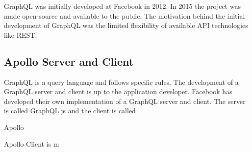 GraphQL was initially developed at Facebook in 2012. In 2015 the project was made open-source and available to the public. The motivation behind the initial development of GraphQL was the limited flexibility of available API technologies like REST.

\subsection{Apollo Server and Client}

GraphQL is a query language and follows specific rules. The development of a GraphQL server and client is up to the application developer. Facebook has developed their own implementation of a GraphQL server and client. The server is called GraphQL.js and the client is called

Apollo 

Apollo Client is m